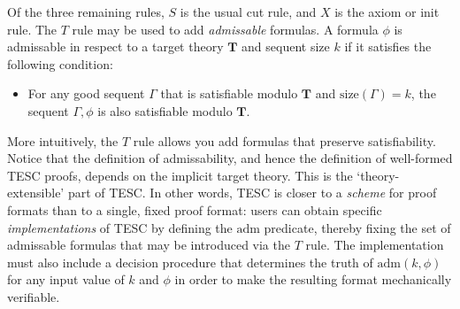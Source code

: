 \documentclass[12pt]{article}
\newcommand{\size}[0]{\mathrm{size}}
\begin{document}
Of the three remaining rules, $S$ is the usual cut rule, and $X$ is the axiom or init rule. 
The $T$ rule may be used to add \textit{admissable} formulas. A formula $\phi$ is admissable 
in respect to a target theory $\mathbf{T}$ and sequent size $k$ if it satisfies the following condition:  
\begin{itemize}
  \item For any good sequent $\Gamma$ that is satisfiable modulo $\mathbf{T}$ and 
  $\size(\Gamma) = k$, the sequent $\Gamma, \phi$ is also satisfiable modulo $\mathbf{T}$. 
\end{itemize}
More intuitively, the $T$ rule allows you add formulas that preserve satisfiability. 
Notice that the definition of admissability, and hence the definition of well-formed 
TESC proofs, depends on the implicit target theory. This is the `theory-extensible' part of TESC. 
In other words, TESC is closer to a \textit{scheme} for proof formats than to a single, fixed proof format: 
users can obtain specific \textit{implementations} of TESC by defining the $\mathrm{adm}$ predicate, thereby 
fixing the set of admissable formulas that may be introduced via the $T$ rule. The implementation must also 
include a decision procedure that determines the truth of $\mathrm{adm}(k, \phi)$
for any input value of $k$ and $\phi$ in order to make the resulting format mechanically verifiable.  
\end{document}
